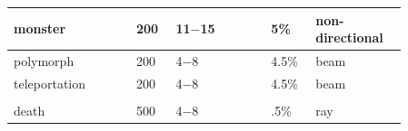 \begin{longtable}{|>{\RaggedRight}p{0.27477\linewidth}|>{\RaggedRight}p{0.08330\linewidth}|>{\RaggedRight}p{0.21924\linewidth}|>{\RaggedRight}p{0.08716\linewidth}|>{\RaggedRight}p{0.19267\linewidth}|}
monster\footnotemark[45]&\hspace*{0pt}\ignorespaces{}\hspace*{0pt}200&\hspace*{0pt}\ignorespaces{}\hspace*{0pt}11{\mbox{$-$}}15&\hspace*{0pt}\ignorespaces{}\hspace*{0pt}5\%&\hspace*{0pt}\ignorespaces{}\hspace*{0pt}non-{}directional\\ \hline \hspace*{0pt}\ignorespaces{}\hspace*{0pt}polymorph\footnotemark[46]&\hspace*{0pt}\ignorespaces{}\hspace*{0pt}200&\hspace*{0pt}\ignorespaces{}\hspace*{0pt}4{\mbox{$-$}}8&\hspace*{0pt}\ignorespaces{}\hspace*{0pt}4.5\%&\hspace*{0pt}\ignorespaces{}\hspace*{0pt}beam\\ \hline \hspace*{0pt}\ignorespaces{}\hspace*{0pt}teleportation\footnotemark[47]&\hspace*{0pt}\ignorespaces{}\hspace*{0pt}200&\hspace*{0pt}\ignorespaces{}\hspace*{0pt}4{\mbox{$-$}}8&\hspace*{0pt}\ignorespaces{}\hspace*{0pt}4.5\%&\hspace*{0pt}\ignorespaces{}\hspace*{0pt}beam\\ \hline \multicolumn{5}{|>{\RaggedRight}p{0.97143\linewidth}|}{\hspace*{0pt}\ignorespaces{}\hspace*{0pt}}\\ \hline \hspace*{0pt}\ignorespaces{}\hspace*{0pt}death\footnotemark[48]&\hspace*{0pt}\ignorespaces{}\hspace*{0pt}500&\hspace*{0pt}\ignorespaces{}\hspace*{0pt}4{\mbox{$-$}}8&\hspace*{0pt}\ignorespaces{}\hspace*{0pt}.5\%&\hspace*{0pt}\ignorespaces{}\hspace*{0pt}ray\\ \hline 
\end{longtable}
